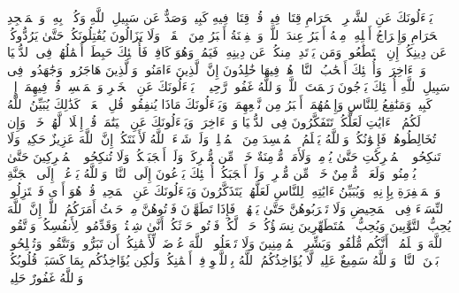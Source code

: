 \stopbuffer
\startbuffer[\q:2:217]
یَسۡءَلُونَكَ عَنِ ٱلشَّهۡرِ ٱلۡحَرَامِ قِتَالࣲ فِیهِۖ قُلۡ قِتَالࣱ فِیهِ كَبِیرࣱۚ وَصَدٌّ عَن سَبِیلِ ٱللَّهِ وَكُفۡرُۢ بِهِۦ وَٱلۡمَسۡجِدِ ٱلۡحَرَامِ وَإِخۡرَاجُ أَهۡلِهِۦ مِنۡهُ أَكۡبَرُ عِندَ ٱللَّهِۚ وَٱلۡفِتۡنَةُ أَكۡبَرُ مِنَ ٱلۡقَتۡلِۗ وَلَا یَزَالُونَ یُقَٰتِلُونَكُمۡ حَتَّىٰ یَرُدُّوكُمۡ عَن دِینِكُمۡ إِنِ ٱسۡتَطَٰعُوا۟ۚ وَمَن یَرۡتَدِدۡ مِنكُمۡ عَن دِینِهِۦ فَیَمُتۡ وَهُوَ كَافِرࣱ فَأُو۟لَٰۤئِكَ حَبِطَتۡ أَعۡمَٰلُهُمۡ فِی ٱلدُّنۡیَا وَٱلۡءَاخِرَةِۖ وَأُو۟لَٰۤئِكَ أَصۡحَٰبُ ٱلنَّارِۖ هُمۡ فِیهَا خَٰلِدُونَ%
\stopbuffer
\startbuffer[\q:2:218]
إِنَّ ٱلَّذِینَ ءَامَنُوا۟ وَٱلَّذِینَ هَاجَرُوا۟ وَجَٰهَدُوا۟ فِی سَبِیلِ ٱللَّهِ أُو۟لَٰۤئِكَ یَرۡجُونَ رَحۡمَتَ ٱللَّهِۚ وَٱللَّهُ غَفُورࣱ رَّحِیمࣱ%
\stopbuffer
\startbuffer[\q:2:219]
۞ یَسۡءَلُونَكَ عَنِ ٱلۡخَمۡرِ وَٱلۡمَیۡسِرِۖ قُلۡ فِیهِمَاۤ إِثۡمࣱ كَبِیرࣱ وَمَنَٰفِعُ لِلنَّاسِ وَإِثۡمُهُمَاۤ أَكۡبَرُ مِن نَّفۡعِهِمَاۗ وَیَسۡءَلُونَكَ مَاذَا یُنفِقُونَۖ قُلِ ٱلۡعَفۡوَۗ كَذَٰلِكَ یُبَیِّنُ ٱللَّهُ لَكُمُ ٱلۡءَایَٰتِ لَعَلَّكُمۡ تَتَفَكَّرُونَ%
\stopbuffer
\startbuffer[\q:2:220]
فِی ٱلدُّنۡیَا وَٱلۡءَاخِرَةِۗ وَیَسۡءَلُونَكَ عَنِ ٱلۡیَتَٰمَىٰۖ قُلۡ إِصۡلَاحࣱ لَّهُمۡ خَیۡرࣱۖ وَإِن تُخَالِطُوهُمۡ فَإِخۡوَٰنُكُمۡۚ وَٱللَّهُ یَعۡلَمُ ٱلۡمُفۡسِدَ مِنَ ٱلۡمُصۡلِحِۚ وَلَوۡ شَاۤءَ ٱللَّهُ لَأَعۡنَتَكُمۡۚ إِنَّ ٱللَّهَ عَزِیزٌ حَكِیمࣱ%
\stopbuffer
\startbuffer[\q:2:221]
وَلَا تَنكِحُوا۟ ٱلۡمُشۡرِكَٰتِ حَتَّىٰ یُؤۡمِنَّۚ وَلَأَمَةࣱ مُّؤۡمِنَةٌ خَیۡرࣱ مِّن مُّشۡرِكَةࣲ وَلَوۡ أَعۡجَبَتۡكُمۡۗ وَلَا تُنكِحُوا۟ ٱلۡمُشۡرِكِینَ حَتَّىٰ یُؤۡمِنُوا۟ۚ وَلَعَبۡدࣱ مُّؤۡمِنٌ خَیۡرࣱ مِّن مُّشۡرِكࣲ وَلَوۡ أَعۡجَبَكُمۡۗ أُو۟لَٰۤئِكَ یَدۡعُونَ إِلَى ٱلنَّارِۖ وَٱللَّهُ یَدۡعُوۤا۟ إِلَى ٱلۡجَنَّةِ وَٱلۡمَغۡفِرَةِ بِإِذۡنِهِۦۖ وَیُبَیِّنُ ءَایَٰتِهِۦ لِلنَّاسِ لَعَلَّهُمۡ یَتَذَكَّرُونَ%
\stopbuffer
\startbuffer[\q:2:222]
وَیَسۡءَلُونَكَ عَنِ ٱلۡمَحِیضِۖ قُلۡ هُوَ أَذࣰى فَٱعۡتَزِلُوا۟ ٱلنِّسَاۤءَ فِی ٱلۡمَحِیضِ وَلَا تَقۡرَبُوهُنَّ حَتَّىٰ یَطۡهُرۡنَۖ فَإِذَا تَطَهَّرۡنَ فَأۡتُوهُنَّ مِنۡ حَیۡثُ أَمَرَكُمُ ٱللَّهُۚ إِنَّ ٱللَّهَ یُحِبُّ ٱلتَّوَّٰبِینَ وَیُحِبُّ ٱلۡمُتَطَهِّرِینَ%
\stopbuffer
\startbuffer[\q:2:223]
نِسَاۤؤُكُمۡ حَرۡثࣱ لَّكُمۡ فَأۡتُوا۟ حَرۡثَكُمۡ أَنَّىٰ شِئۡتُمۡۖ وَقَدِّمُوا۟ لِأَنفُسِكُمۡۚ وَٱتَّقُوا۟ ٱللَّهَ وَٱعۡلَمُوۤا۟ أَنَّكُم مُّلَٰقُوهُۗ وَبَشِّرِ ٱلۡمُؤۡمِنِینَ%
\stopbuffer
\startbuffer[\q:2:224]
وَلَا تَجۡعَلُوا۟ ٱللَّهَ عُرۡضَةࣰ لِّأَیۡمَٰنِكُمۡ أَن تَبَرُّوا۟ وَتَتَّقُوا۟ وَتُصۡلِحُوا۟ بَیۡنَ ٱلنَّاسِۚ وَٱللَّهُ سَمِیعٌ عَلِیمࣱ%
\stopbuffer
\startbuffer[\q:2:225]
لَّا یُؤَاخِذُكُمُ ٱللَّهُ بِٱللَّغۡوِ فِیۤ أَیۡمَٰنِكُمۡ وَلَٰكِن یُؤَاخِذُكُم بِمَا كَسَبَتۡ قُلُوبُكُمۡۗ وَٱللَّهُ غَفُورٌ حَلِیمࣱ%
